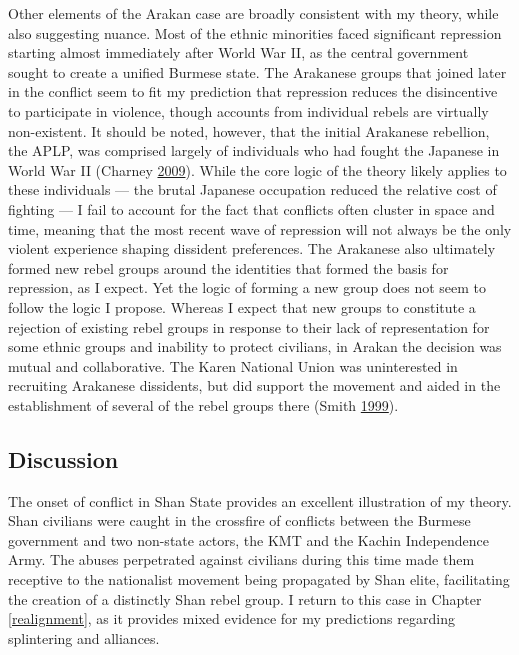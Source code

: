\documentclass[12pt,]{book}
\theoremstyle{definition}
\theoremstyle{definition}
\theoremstyle{definition}
\theoremstyle{remark}
\begin{document}
Other elements of the Arakan case are broadly consistent with my theory,
while also suggesting nuance. Most of the ethnic minorities faced
significant repression starting almost immediately after World War II,
as the central government sought to create a unified Burmese state. The
Arakanese groups that joined later in the conflict seem to fit my
prediction that repression reduces the disincentive to participate in
violence, though accounts from individual rebels are virtually
non-existent. It should be noted, however, that the initial Arakanese
rebellion, the APLP, was comprised largely of individuals who had fought
the Japanese in World War II (Charney
\protect\hyperlink{ref-Charney2009}{2009}). While the core logic of the
theory likely applies to these individuals --- the brutal Japanese
occupation reduced the relative cost of fighting --- I fail to account
for the fact that conflicts often cluster in space and time, meaning
that the most recent wave of repression will not always be the only
violent experience shaping dissident preferences. The Arakanese also
ultimately formed new rebel groups around the identities that formed the
basis for repression, as I expect. Yet the logic of forming a new group
does not seem to follow the logic I propose. Whereas I expect that new
groups to constitute a rejection of existing rebel groups in response to
their lack of representation for some ethnic groups and inability to
protect civilians, in Arakan the decision was mutual and collaborative.
The Karen National Union was uninterested in recruiting Arakanese
dissidents, but did support the movement and aided in the establishment
of several of the rebel groups there (Smith
\protect\hyperlink{ref-Smith1999}{1999}).

\hypertarget{discussion}{%
\subsection{Discussion}\label{discussion}}

The onset of conflict in Shan State provides an excellent illustration
of my theory. Shan civilians were caught in the crossfire of conflicts
between the Burmese government and two non-state actors, the KMT and the
Kachin Independence Army. The abuses perpetrated against civilians
during this time made them receptive to the nationalist movement being
propagated by Shan elite, facilitating the creation of a distinctly Shan
rebel group. I return to this case in Chapter \ref{realignment}, as it
provides mixed evidence for my predictions regarding splintering and
alliances.
\end{document}

